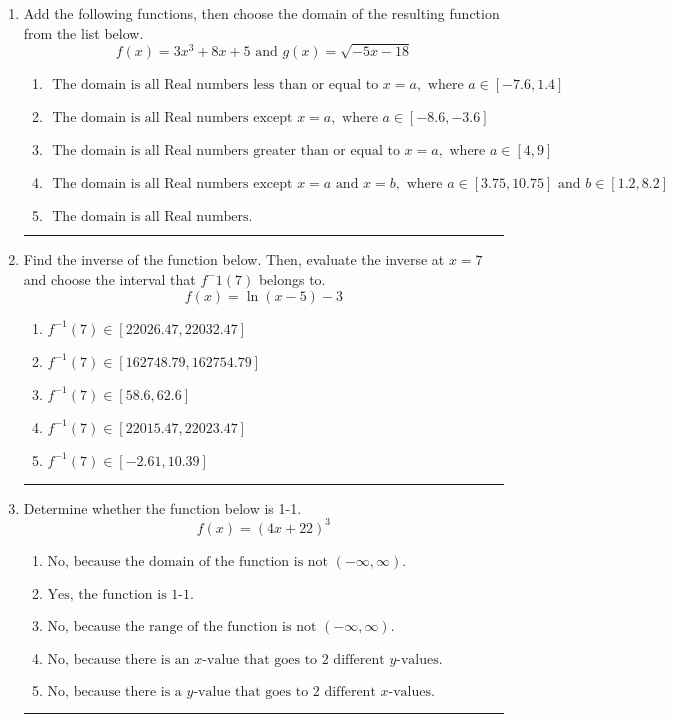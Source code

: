 \documentclass[14pt]{extbook}
\newcommand{\litem}[1]{\item#1\hspace*{-1cm}\rule{\textwidth}{0.4pt}}
\begin{document}
\begin{enumerate}
\litem{
Add the following functions, then choose the domain of the resulting function from the list below.\[ f(x) = 3x^{3} +8 x + 5 \text{ and } g(x) = \sqrt{-5x-18}  \]\begin{enumerate}[label=\Alph*.]
\item \( \text{ The domain is all Real numbers less than or equal to } x = a, \text{ where } a \in [-7.6, 1.4] \)
\item \( \text{ The domain is all Real numbers except } x = a, \text{ where } a \in [-8.6, -3.6] \)
\item \( \text{ The domain is all Real numbers greater than or equal to } x = a, \text{ where } a \in [4, 9] \)
\item \( \text{ The domain is all Real numbers except } x = a \text{ and } x = b, \text{ where } a \in [3.75, 10.75] \text{ and } b \in [1.2, 8.2] \)
\item \( \text{ The domain is all Real numbers. } \)

\end{enumerate} }
\litem{
Find the inverse of the function below. Then, evaluate the inverse at $x = 7$ and choose the interval that $f^-1(7)$ belongs to.\[ f(x) = \ln{(x-5)}-3 \]\begin{enumerate}[label=\Alph*.]
\item \( f^{-1}(7) \in [22026.47, 22032.47] \)
\item \( f^{-1}(7) \in [162748.79, 162754.79] \)
\item \( f^{-1}(7) \in [58.6, 62.6] \)
\item \( f^{-1}(7) \in [22015.47, 22023.47] \)
\item \( f^{-1}(7) \in [-2.61, 10.39] \)

\end{enumerate} }
\litem{
Determine whether the function below is 1-1.\[ f(x) = (4 x + 22)^3 \]\begin{enumerate}[label=\Alph*.]
\item \( \text{No, because the domain of the function is not $(-\infty, \infty)$.} \)
\item \( \text{Yes, the function is 1-1.} \)
\item \( \text{No, because the range of the function is not $(-\infty, \infty)$.} \)
\item \( \text{No, because there is an $x$-value that goes to 2 different $y$-values.} \)
\item \( \text{No, because there is a $y$-value that goes to 2 different $x$-values.} \)


\end{enumerate}}
\end{enumerate}
\end{document}

